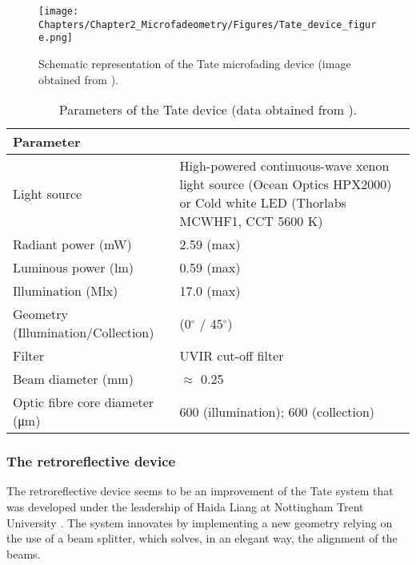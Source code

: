 \begin{figure*}
\centering
\texttt{[image: Chapters/Chapter2\_Microfadeometry/Figures/Tate\_device\_figure.png]}
\caption[\hspace{0.3cm}The Tate microfading device]{Schematic representation of the Tate microfading device (image obtained from \citet[23]{lerwill_micro-fading_2011}).}
\label{fig:MFT_Tate}
\end{figure*}

\begin{table*}
\centering %
\caption[\hspace{0.3cm}Parameters of the Tate device]{Parameters of the Tate device (data obtained from \citet[22-9]{lerwill_micro-fading_2011}).}
\begin{tabular}{R{5.5cm}L{7cm}}
\toprule[0.4mm]
\textbf{Parameter} &  \\\midrule
Light source & High-powered continuous-wave xenon light source (Ocean Optics HPX2000) or Cold white LED (Thorlabs MCWHF1, CCT 5600 K)\\
Radiant power (\unit{\milli\watt}) & 2.59 (max) \\
Luminous power (\unit{\lumen}) & 0.59 (max) \\
Illumination (\unit{\mega\lux}) & 17.0 (max) \\
Geometry (Illumination/Collection) & (0$^\circ$ / 45$^\circ$) \\
Filter & UVIR cut-off filter \\
Beam diameter (\unit{\mm}) & $\approx$ 0.25\\
Optic fibre core diameter (\unit{\um}) & 600 (illumination); 600 (collection) \\ 
\bottomrule[0.4mm]
\end{tabular}
\label{tab:MFT_Tate}
\end{table*}



\subsubsection{The retroreflective device}
\label{sec:retroreflective_MFT}

The retroreflective device seems to be an improvement of the Tate system that was developed under the leadership of Haida Liang at Nottingham Trent University \citep{liang_development_2011}. The system innovates by implementing a new geometry relying on the use of a beam splitter, which solves, in an elegant way, the alignment of the beams. \\

